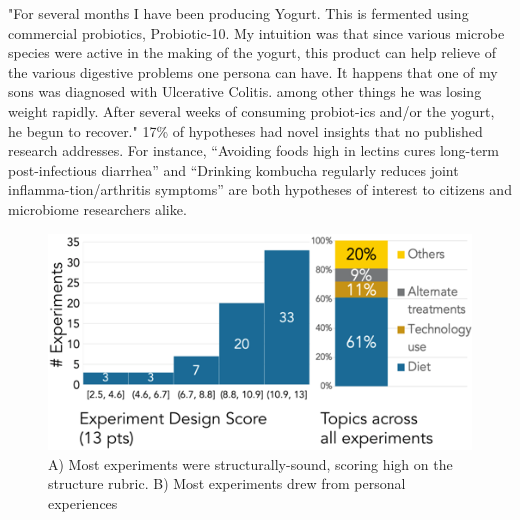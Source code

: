"For several months I have been producing Yogurt. This is fermented using commercial probiotics, Probiotic-10. My intuition was that since various microbe species were active in the making of the yogurt, this product can help relieve of the various digestive problems one persona can have. It happens that one of my sons was diagnosed with Ulcerative Colitis. among other things he was losing weight rapidly. After several weeks of consuming probiot-ics and/or the yogurt, he begun to recover."
17\% of hypotheses had novel insights that no published research addresses. For instance, “Avoiding foods high in lectins cures long-term post-infectious diarrhea” and “Drinking kombucha regularly reduces joint inflamma-tion/arthritis symptoms” are both hypotheses of interest to citizens and microbiome researchers alike.

\begin{figure}[h] 
\centering
  \includegraphics[width=1.0\textwidth]{figures/galileo/galileo-study2-1}
  \caption[Results: Most experiments were structurally-sound and drew from personal experiences]
{A) Most experiments were structurally-sound, scoring high on the structure rubric. B) Most experiments drew from personal experiences }
  \label{fig:galileo-result2}
\end{figure}

